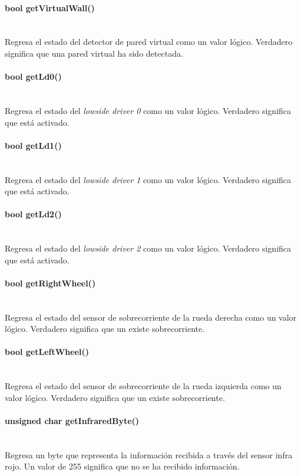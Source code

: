 \documentclass[letterpaper,openright,12pt]{book}
\begin{document}
\paragraph{bool getVirtualWall()}\mbox{}\\
Regresa el estado del detector de pared virtual como un valor lógico. Verdadero significa que una pared virtual ha sido detectada.\\
\paragraph{bool getLd0()}\mbox{}\\
Regresa el estado del \emph{lowside driver 0} como un valor lógico. Verdadero significa que está activado.\\
\paragraph{bool getLd1()}\mbox{}\\
Regresa el estado del \emph{lowside driver 1} como un valor lógico. Verdadero significa que está activado.\\
\paragraph{bool getLd2()}\mbox{}\\
Regresa el estado del \emph{lowside driver 2} como un valor lógico. Verdadero significa que está activado.\\

\paragraph{bool getRightWheel()}\mbox{}\\
Regresa el estado del sensor de sobrecorriente de la rueda derecha como un valor lógico. Verdadero significa que un existe sobrecorriente.\\
\paragraph{	bool getLeftWheel()}\mbox{}\\
Regresa el estado del sensor de sobrecorriente de la rueda izquierda como un valor lógico. Verdadero significa que un existe sobrecorriente.\\
\paragraph{unsigned char getInfraredByte()}\mbox{}\\
Regresa un byte que representa la información recibida a través del sensor infra rojo. Un valor de 255 significa que no se ha recibido información.\\
\end{document}
